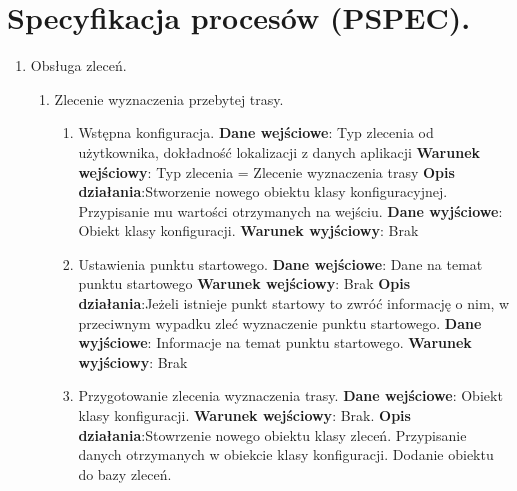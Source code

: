 \documentclass[11pt]{article}
\begin{document}
	\section{Specyfikacja procesów (PSPEC).}
	\begin{enumerate}
		\item Obsługa zleceń.
		\begin{enumerate}[label*=\arabic*.]
			\item Zlecenie wyznaczenia przebytej trasy.
			\begin{enumerate}[label*=\arabic*.]
				\item Wstępna konfiguracja. \newline
				\textbf{Dane wejściowe}: Typ zlecenia od użytkownika, dokładność lokalizacji z danych aplikacji	\newline
				\textbf{Warunek wejściowy}: Typ zlecenia = Zlecenie wyznaczenia trasy		\newline   	
				\textbf{Opis działania}:\newline Stworzenie nowego obiektu klasy konfiguracyjnej. \newline Przypisanie mu wartości otrzymanych na wejściu.	\newline
				\textbf{Dane wyjściowe}: Obiekt klasy konfiguracji.	\newline
				\textbf{Warunek wyjściowy}: Brak
				\item Ustawienia punktu startowego. \newline
				\textbf{Dane wejściowe}: Dane na temat punktu startowego	\newline
				\textbf{Warunek wejściowy}: Brak		\newline   	
				\textbf{Opis działania}:\newline Jeżeli istnieje punkt startowy to zwróć informację o nim, w przeciwnym wypadku zleć wyznaczenie punktu startowego. 	\newline
				\textbf{Dane wyjściowe}: Informacje na temat punktu startowego.	\newline
				\textbf{Warunek wyjściowy}: Brak
				\item Przygotowanie zlecenia wyznaczenia trasy. \newline
				\textbf{Dane wejściowe}: Obiekt klasy konfiguracji.	\newline
				\textbf{Warunek wejściowy}: Brak.		\newline   	
				\textbf{Opis działania}:\newline Stowrzenie nowego obiektu klasy zleceń.
				\newline Przypisanie danych otrzymanych w obiekcie klasy konfiguracji. \newline Dodanie obiektu do bazy zleceń.	\newline

\end{enumerate}
\end{enumerate}
\end{enumerate}
\end{document}
